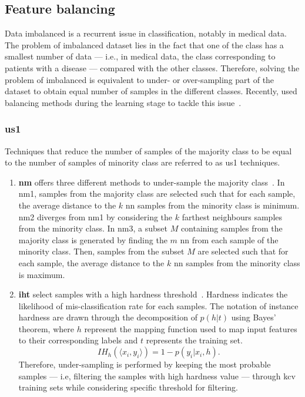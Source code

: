 \subsection{Feature balancing}\label{subsec:chp6:method:fea-bal}
Data imbalanced is a recurrent issue in classification, notably in medical
data.
The problem of imbalanced dataset lies in the fact that one of the class has a
smallest number of data --- i.e., in medical data, the class corresponding to
patients with a disease --- compared with the other classes.
Therefore, solving the problem of imbalanced is equivalent to under- or
over-sampling part of the dataset to obtain equal number of samples in the
different classes.
Recently, \citeauthor{Lemaitre2016thesis} used balancing methods during the
learning stage to tackle this issue~\cite{imblearn}.

\subsubsection{\Acl*{us1}}
Techniques that reduce the number of samples of the majority class to be equal
to the number of samples of minority class are referred to as \ac{us1}
techniques.

\begin{enumerate}[leftmargin=*]

\item[] \textbf{\Ac{nm}} offers three different methods to under-sample the majority
  class~\cite{mani2003knn}.
  In \ac{nm1}, samples from the majority class are selected such that for each
  sample, the average distance to the $k$ \ac{nn} samples from the minority class
  is minimum.
  \ac{nm2} diverges from \ac{nm1} by considering the $k$ farthest neighbours
  samples from the minority class.
  In \ac{nm3}, a subset $M$ containing samples from the majority class is
  generated by finding the $m$ \ac{nn} from each sample of the minority class.
  Then, samples from the subset $M$ are selected such that for each sample, the
  average distance to the $k$ \ac{nn} samples from the minority class is
  maximum.

\item[] \textbf{\Ac{iht}} select samples with a high hardness
  threshold~\cite{smith2014instance}.
  Hardness indicates the likelihood of mis-classification rate for each samples.
  The notation of instance hardness are drawn through the decomposition of $p(h
  \vert t)$ using Bayes' theorem, where $h$ represent the mapping function used
  to map input features to their corresponding labels and $t$ represents the
  training set.
  \begin{equation}
    IH_h(\langle x_{i}, y_{i}\rangle) = 1 - p(y_i \vert x_i, h).\
    \label{eq:iht}
  \end{equation}
  Therefore, under-sampling is performed by keeping the most probable samples ---
  i.e, filtering the samples with high hardness value --- through \ac{kcv}
  training sets while considering specific threshold for filtering.

\end{enumerate}

